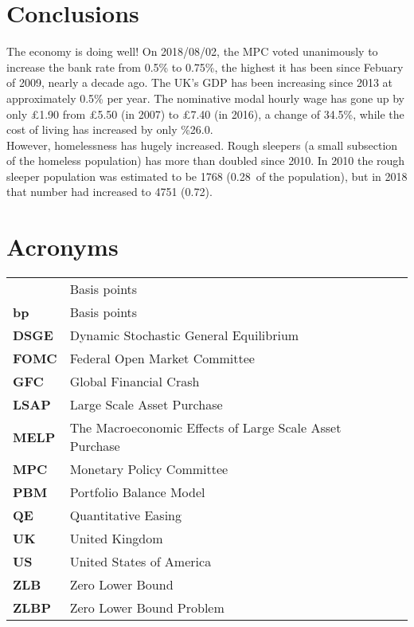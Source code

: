 \documentclass[notitlepage,12pt]{report}
\begin{document}
\chapter{Conclusions}

The economy is doing well! On 2018/08/02, the MPC voted unanimously to increase the bank rate from 0.5\% to 0.75\%, the highest it has been since Febuary of 2009, nearly a decade ago.\cite{boe_minutes} The UK's GDP has been increasing since 2013 at approximately 0.5\% per year.\cite{uk_gdp} The nominative modal hourly wage has gone up by only \pounds1.90 from \pounds5.50 (in 2007) to \pounds7.40 (in 2016)\cite{noauthor_analysis_nodate}, a change of 34.5\%, while the cost of living has increased by only \%26.0.\cite{cpi_uk}\\
However, homelessness has hugely increased. Rough sleepers (a small subsection of the homeless population) has more than doubled since 2010. In 2010 the rough sleeper population was estimated to be 1768 (0.28\textpertenthousand~of the population), but in 2018 that number had increased to 4751 (0.72\textpertenthousand).\cite{ryan_rough_nodate}

\chapter{Acronyms}

\begin{tabular}{@{$\bullet$ }lp{\textwidth}l}
	{\bf \textpertenthousand} & Basis points\\
	{\bf bp} & Basis points\\
	{\bf DSGE} & Dynamic Stochastic General Equilibrium\\
	{\bf FOMC} & Federal Open Market Committee\\
	{\bf GFC} & Global Financial Crash\\
	{\bf LSAP} & Large Scale Asset Purchase\\
	{\bf MELP} & The Macroeconomic Effects of Large Scale Asset Purchase\cite{chen_macroeconomic_2011}\\
	{\bf MPC} & Monetary Policy Committee\\
	{\bf PBM} & Portfolio Balance Model\\
	{\bf QE} & Quantitative Easing\\
	{\bf UK} & United Kingdom\\
	{\bf US} & United States of America\\
	{\bf ZLB} & Zero Lower Bound\\
	{\bf ZLBP} & Zero Lower Bound Problem
\end{tabular}
\end{document}
